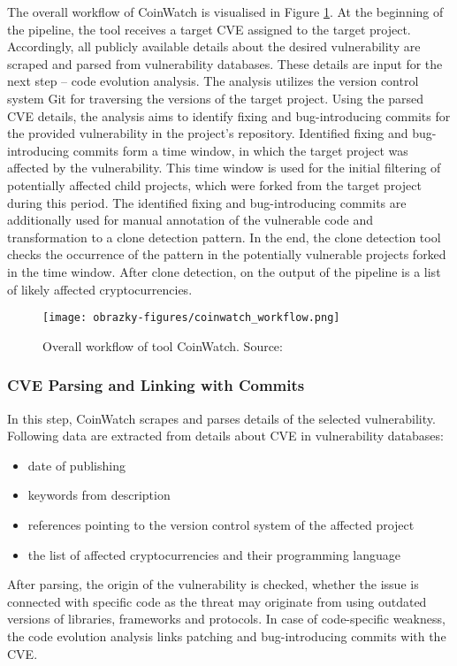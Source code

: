    The overall workflow of CoinWatch is visualised in Figure \ref{coinwatch-workflow}. At the beginning
    of the pipeline, the tool receives a target CVE assigned to the target project. Accordingly, all publicly
    available details about the desired vulnerability are scraped and parsed from vulnerability databases.
    These details are input for the next step -- code evolution analysis. The analysis utilizes the version
    control system Git for traversing the versions of the target project. Using the parsed CVE details,
    the analysis aims to identify fixing and bug-introducing commits for the provided vulnerability
    in the project's repository. Identified fixing and bug-introducing commits form a time window, in which
    the target project was affected by the vulnerability. This time window is used for the initial filtering
    of potentially affected child projects, which were forked from the target project during this period.
    The identified fixing and bug-introducing commits are additionally used for manual annotation of
    the vulnerable code and transformation to a clone detection pattern. In the end, the clone detection tool
    checks the occurrence of the pattern in the potentially vulnerable projects forked in the time window.
    After clone detection, on the output of the pipeline is a list of likely affected cryptocurrencies.

    \begin{figure}[h]
      \centering
      \texttt{[image: obrazky-figures/coinwatch\_workflow.png]}
      \caption{Overall workflow of tool CoinWatch. Source:~\cite{CoinWatch}}
      \label{coinwatch-workflow}
    \end{figure}

    \subsubsection*{CVE Parsing and Linking with Commits}
      In this step, CoinWatch scrapes and parses details of the selected vulnerability. Following data
      are extracted from details about CVE in vulnerability databases:
      \begin{itemize}
          \item date of publishing
          \item keywords from description
          \item references pointing to the version control system of the affected project
          \item the list of affected cryptocurrencies and their programming language
      \end{itemize}
      After parsing, the origin of the vulnerability is checked, whether the issue is connected with specific
      code as the threat may originate from using outdated versions of libraries, frameworks and protocols.
      In case of code-specific weakness, the code evolution analysis links patching and bug-introducing
      commits with the CVE.

